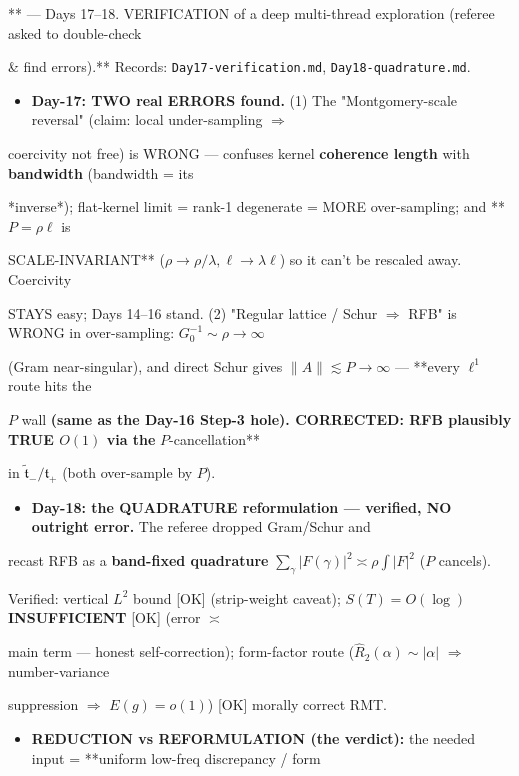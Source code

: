 \documentclass[10pt]{article}
\begin{document}
** --- Days 17--18. VERIFICATION of a deep multi-thread exploration (referee asked to double-check\par
\& find errors).** Records: \texttt{Day17-verification.md}, \texttt{Day18-quadrature.md}.\par
\begin{itemize}
\item \textbf{Day-17: TWO real ERRORS found.} (1) The "Montgomery-scale reversal" (claim: local under-sampling \ensuremath{\Rightarrow}
\end{itemize}
  coercivity not free) is WRONG --- confuses kernel \textbf{coherence length} with \textbf{bandwidth} (bandwidth = its\par
  *inverse*); flat-kernel limit = rank-1 degenerate = MORE over-sampling; and **$P=\rho\ell$ is\par
  SCALE-INVARIANT** ($\rho\to\rho/\lambda,\ell\to\lambda\ell$) so it can't be rescaled away. Coercivity\par
  STAYS easy; Days 14--16 stand. (2) "Regular lattice / Schur \ensuremath{\Rightarrow} RFB" is WRONG in over-sampling: $G_0^{-1}\sim\rho\to\infty$\par
  (Gram near-singular), and direct Schur gives $\|A\|\lesssim P\to\infty$ --- **every $\ell^1$ route hits the\par
  $P$ wall\textbf{ (same as the Day-16 Step-3 hole). CORRECTED: RFB plausibly TRUE $O(1)$ via the }$P$-cancellation**\par
  in $\widetilde{\mathfrak t}_-/\mathfrak t_+$ (both over-sample by $P$).\par
\begin{itemize}
\item \textbf{Day-18: the QUADRATURE reformulation --- verified, NO outright error.} The referee dropped Gram/Schur and
\end{itemize}
  recast RFB as a \textbf{band-fixed quadrature} $\sum_\gamma|F(\gamma)|^2\asymp\rho\int|F|^2$ ($P$ cancels).\par
  Verified: vertical $L^2$ bound [OK] (strip-weight caveat); \textbf{$S(T)=O(\log)$ INSUFFICIENT} [OK] (error $\asymp$\par
  main term --- honest self-correction); form-factor route ($\widehat R_2(\alpha)\sim|\alpha|$ \ensuremath{\Rightarrow} number-variance\par
  suppression \ensuremath{\Rightarrow} $E(g)=o(1)$) [OK] morally correct RMT.\par
\begin{itemize}
\item \textbf{REDUCTION vs REFORMULATION (the verdict):} the needed input = **uniform low-freq discrepancy / form
\end{itemize}
\end{document}
